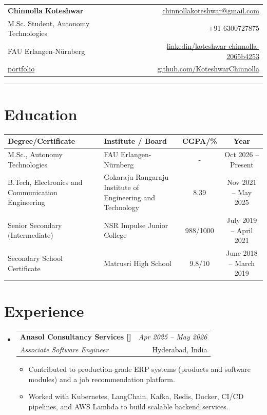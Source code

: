 \documentclass[a4paper,11pt]{article}
\makeatletter
\newcommand{\resumeSubheading}[4]{
\vspace{0.5mm}\item
    \begin{tabular*}{0.98\textwidth}[t]{l@{\extracolsep{\fill}}r}
        \textbf{#1} & \textit{\footnotesize{#4}} \\
        \textit{\footnotesize{#3}} &  \footnotesize{#2}\\
    \end{tabular*}
    \vspace{-2.4mm}
}
\newcommand{\resumeSubHeadingListStart}{\begin{itemize}[leftmargin=*,labelsep=1mm]}
\newcommand{\resumeItemListStart}{\begin{itemize}[leftmargin=*,labelsep=1mm,itemsep=0.2mm]}
\newcommand{\resumeSubHeadingListEnd}{\end{itemize}\vspace{-2mm}}
\newcommand{\resumeItemListEnd}{\end{itemize}\vspace{-2mm}}
\newcommand{\name}{Chinnolla Koteshwar}
\newcommand{\roll}{}
\newcommand{\phone}{6300727875}
\newcommand{\email}{chinnollakoteshwar@gmail.com}
\newcommand{\github}{KoteshwarChinnolla}
\newcommand{\linkedin}{koteshwar-chinnolla-2065b4253}
\makeatother
\begin{document}
\selectfont

\begin{tabularx}{\linewidth}{X r}
  {\LARGE \textbf{\name}} & \href{mailto:\email}{\email}\\
  M.Sc. Student, Autonomy Technologies &  +91-\phone\\
  FAU Erlangen-Nürnberg & \href{https://www.linkedin.com/in/\linkedin}{linkedin/\linkedin} \\ \roll  \href{https://koteshwarchinnolla.github.io/}{portfolio} & \href{https://github.com/\github}{github.com/\github} \\
  \end{tabularx}
\vspace{1mm}
\hrule
\vspace{2mm}

\section*{Education}
\renewcommand{\arraystretch}{1.1} %
\setlength{\tabcolsep}{6pt}
\begin{tabularx}{\textwidth}{|X|X|c|c|}
  \hline
  \textbf{Degree/Certificate} & \textbf{Institute / Board} & \textbf{CGPA/\%} & \textbf{Year} \\
  \hline
  M.Sc., Autonomy Technologies & 
  FAU Erlangen-Nürnberg & 
  - & Oct 2026 -- Present \\
  \hline
  B.Tech, Electronics and Communication Engineering & 
  Gokaraju Rangaraju Institute of Engineering and Technology & 
  8.39 & Nov 2021 -- May 2025 \\
  \hline
  Senior Secondary (Intermediate) & NSR Impulse Junior College & 
  988/1000 & July 2019 -- April 2021 \\
  \hline
  Secondary School Certificate & Matrusri High School & 
  9.8/10 & June 2018 -- March 2019 \\
  \hline
\end{tabularx}
\vspace{-2mm}

\section{\textbf{Experience}}
\resumeSubHeadingListStart
\resumeSubheading
    {Anasol Consultancy Services [\href{https://anasol.co.in/}{\faIcon{globe}}]}{Hyderabad, India}
    {Associate Software Engineer}{Apr 2025 -- May 2026}
    \resumeItemListStart
      \item Contributed to production-grade ERP systems (products and software modules) and a job recommendation platform.
      \item Worked with Kubernetes, LangChain, Kafka, Redis, Docker, CI/CD pipelines, and AWS Lambda to build scalable backend services.
    \resumeItemListEnd
\resumeSubHeadingListEnd
\vspace{-2mm}
\end{document}
